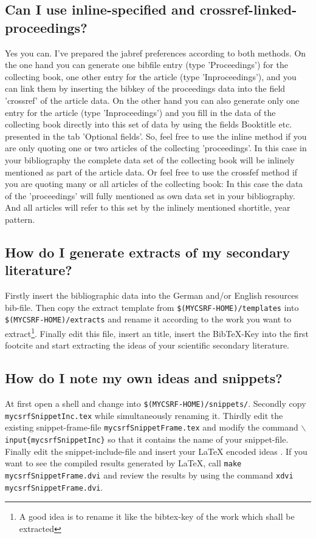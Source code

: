 \documentclass[DIV=calc,BCOR=5mm,11pt,headings=small,oneside,abstract=true, toc=bib]{scrartcl}
\begin{document}
\subsection{Can I use inline-specified and crossref-linked-proceedings?} 
Yes you can. I've prepared the jabref preferences according to both methods.
On the one hand you can generate one bibfile entry (type 'Proceedings') for the
collecting book, one other entry for the article (type 'Inproceedings'), and you
can link them by inserting the bibkey of the proceedings data into the field
'crossref' of the article data. On the other hand you can also generate only one
entry for the article (type 'Inproceedings') and you fill in the data of the
collecting book directly into this set of data by using the fields Booktitle
etc. presented in the tab 'Optional fields'. So, feel free to use the inline
method if you are only quoting one or two articles of the collecting
'proceedings'. In this case in your bibliography the complete data set of the
collecting book will be inlinely mentioned as part of the article data. Or feel
free to use the crossfef method if you are quoting many or all articles of the
collecting book: In this case the data of the 'proceedings' will fully mentioned
as own data set in your bibliography. And all articles will refer to this set by
the inlinely mentioned shortitle, year pattern.

\subsection{How do I generate extracts of my secondary literature?}
Firstly insert the bibliographic data into the German and/or English
resources bib-file. Then copy the extract template from
\texttt{\$(MYCSRF-HOME)/templates} into
\texttt{\$(MYCSRF-HOME)/extracts} and rename it according to the work you
want to extract\footnote{A good idea is to rename it like the bibtex-key of the
work which shall be extracted}. Finally edit this file, insert an title, insert
the BibTeX-Key into the first footcite and start extracting the ideas of your
scientific secondary literature.

\subsection{How do I note my own ideas and snippets?}
At first open a shell and change into \texttt{\$(MYCSRF-HOME)/snippets/}.
Se\-cond\-ly copy \texttt{mycsrfSnippetInc.tex} while simultaneously renaming
it. Thirdly edit the existing snippet-frame-file \texttt{mycsrfSnippetFrame.tex}
and modify the command \texttt{$\backslash$input\{mycsrfSnippetInc\}} so that it
contains the name of your snippet-file. Finally edit the snippet-include-file
and insert your LaTeX encoded ideas . If you want to see the compiled results
generated by LaTeX, call \texttt{make mycsrfSnippetFrame.dvi} and review the
results by using the command \texttt{xdvi mycsrfSnippetFrame.dvi}.
\end{document}
